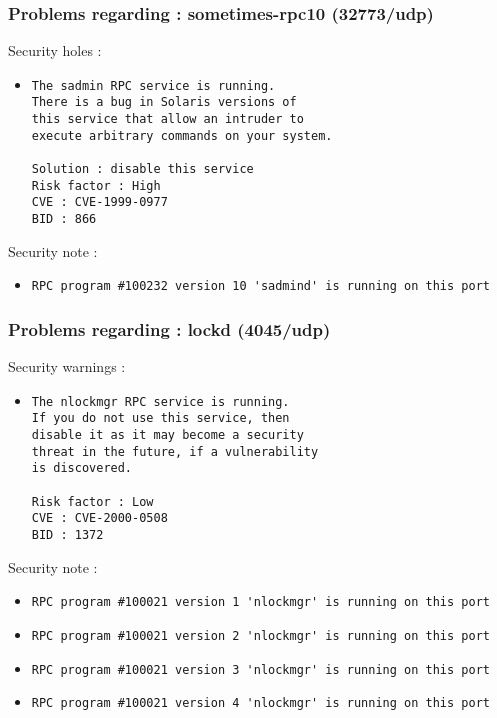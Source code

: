 \documentclass{article}
\begin{document}
\subsubsection{Problems regarding : sometimes-rpc10 (32773/udp)}
Security holes :\\
\begin{itemize}
\item \begin{verbatim}
The sadmin RPC service is running. 
There is a bug in Solaris versions of
this service that allow an intruder to
execute arbitrary commands on your system.

Solution : disable this service
Risk factor : High
CVE : CVE-1999-0977
BID : 866
\end{verbatim}\end{itemize}
Security note :\\
\begin{itemize}
\item \begin{verbatim}
RPC program #100232 version 10 'sadmind' is running on this port
\end{verbatim}\end{itemize}
\subsubsection{Problems regarding : lockd (4045/udp)}
Security warnings :\\
\begin{itemize}
\item \begin{verbatim}
The nlockmgr RPC service is running. 
If you do not use this service, then
disable it as it may become a security
threat in the future, if a vulnerability
is discovered.

Risk factor : Low
CVE : CVE-2000-0508
BID : 1372
\end{verbatim}\end{itemize}
Security note :\\
\begin{itemize}
\item \begin{verbatim}
RPC program #100021 version 1 'nlockmgr' is running on this port
\end{verbatim}\item \begin{verbatim}
RPC program #100021 version 2 'nlockmgr' is running on this port
\end{verbatim}\item \begin{verbatim}
RPC program #100021 version 3 'nlockmgr' is running on this port
\end{verbatim}\item \begin{verbatim}
RPC program #100021 version 4 'nlockmgr' is running on this port
\end{verbatim}\end{itemize}
\end{document}
